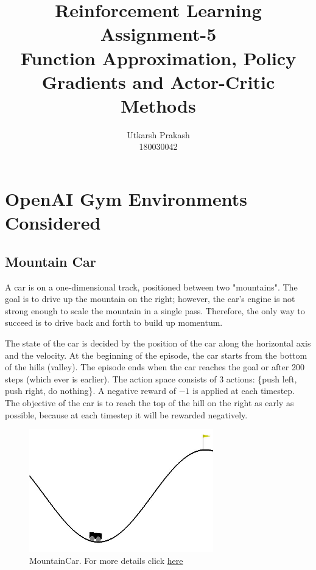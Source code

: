 \documentclass{article}
\title{Reinforcement Learning Assignment-5 \\
	\Large Function Approximation, Policy Gradients and Actor-Critic Methods \\}
\begin{document}
\author{Utkarsh Prakash \\ \normalsize 180030042}
\maketitle
\section{OpenAI Gym Environments Considered}
    \subsection{Mountain Car}
    A car is on a one-dimensional track, positioned between two "mountains". The goal is to drive up the mountain on the right; 
    however, the car's engine is not strong enough to scale the mountain in a single pass. Therefore, the only way to succeed is to 
    drive back and forth to build up momentum. \par

    \noindent %
    The state of the car is decided by the position of the car along the horizontal axis and the velocity. At the beginning of the
    episode, the car starts from the bottom of the hills (valley). The episode ends when the car reaches the goal or after
    200 steps (which ever is earlier). The action space consists of 3 actions: \{push left, push right, do nothing\}. A negative reward
    of $-1$ is applied at each timestep. The objective of the car is to reach the top of the hill on the right as early as possible, 
    because at each timestep it will be rewarded negatively. \par

    \begin{figure}[H]
        \graphicspath{ {../tmp/} }
        \begin{center}
        \includegraphics[width=8cm]{mountain_car.jpg}
        \end{center}
        \caption{MountainCar. For more details click \href{https://gym.openai.com/envs/MountainCar-v0/}{here} }
        \label{mountain_car}
    \end{figure}
\end{document}
